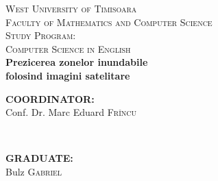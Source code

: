 \documentclass[12pt, a4paper]{report}
\begin{document}
\begin{titlepage}

\newcommand{\HRule}{\rule{\linewidth}{0.5mm}} %

\center %


\vspace{3cm}


\textsc{\LARGE West University of  Timisoara}\\[0.5cm] %
\textsc{\Large Faculty of Mathematics and Computer Science}\\[0.5cm] %
\textsc{\large Study Program: \\Computer Science in English}\\[6cm] %




{\Huge \bfseries Prezicerea zonelor inundabile}
\\[0.4cm]
{\Huge \bf folosind imagini satelitare}\\[5cm] %
 


\begin{minipage}{0.4\textwidth}
\begin{flushleft} \large
\textbf{COORDINATOR:}\\
Conf. Dr. Marc Eduard \textsc{Fr\^incu} %
\end{flushleft}
\end{minipage}
~
\begin{minipage}{0.4\textwidth}
\begin{flushright} \large
\textbf{GRADUATE:} \\
Bulz \textsc{Gabriel} %
\end{flushright}
\end{minipage}\\[1cm]


\end{titlepage}
\end{document}
